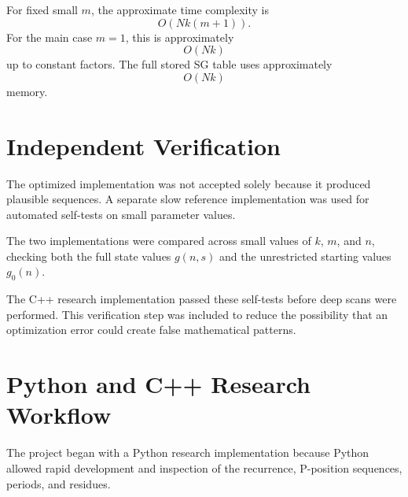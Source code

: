 \documentclass[11pt]{article}
\begin{document}
For fixed small $m$, the approximate time complexity is
\begin{equation}
    O\!\left(Nk(m+1)\right).
\end{equation}
For the main case $m=1$, this is approximately
\begin{equation}
    O(Nk)
\end{equation}
up to constant factors. The full stored SG table uses approximately
\begin{equation}
    O(Nk)
\end{equation}
memory.

\section{Independent Verification}

The optimized implementation was not accepted solely because it produced plausible sequences. A separate slow reference implementation was used for automated self-tests on small parameter values.

The two implementations were compared across small values of $k$, $m$, and $n$, checking both the full state values $g(n,s)$ and the unrestricted starting values $g_0(n)$.

The C++ research implementation passed these self-tests before deep scans were performed. This verification step was included to reduce the possibility that an optimization error could create false mathematical patterns.

\section{Python and C++ Research Workflow}

The project began with a Python research implementation because Python allowed rapid development and inspection of the recurrence, P-position sequences, periods, and residues.
\end{document}
